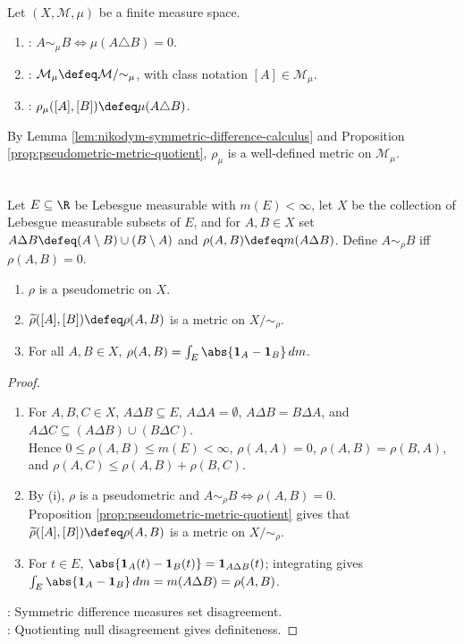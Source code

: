 \begin{definition} \label{def:nikodym-metric-space} \\
Let $(X,\mathcal{M},\mu)$ be a finite measure space.
\begin{enumerate}[label=(\roman*)]
\setlength{\itemsep}{0pt}
\item {}: $A\sim_\mu B\Leftrightarrow\mu(A\triangle B)=0$.
\item {}: $\mathcal{M}_\mu\defeq\mathcal{M}/{\sim_\mu}$, with class notation $[A]\in\mathcal{M}_\mu$.
\item {}: $\rho_\mu([A],[B])\defeq\mu(A\triangle B)$.
\end{enumerate}
By Lemma \ref{lem:nikodym-symmetric-difference-calculus} and Proposition \ref{prop:pseudometric-metric-quotient}, $\rho_\mu$ is a well-defined metric on $\mathcal{M}_\mu$.
\end{definition}

\begin{proposition} \label{prop:nikodym-pseudometric} \\
Let $E\subseteq\R$ be Lebesgue measurable with $m(E)<\infty$, let $X$ be the collection of Lebesgue measurable subsets of $E$, and for $A,B\in X$ set $A\Delta B\defeq(A\setminus B)\cup(B\setminus A)$ and $\rho(A,B)\defeq m(A\Delta B)$. Define $A\sim_\rho B$ iff $\rho(A,B)=0$.
\begin{enumerate}[label=(\roman*)]
\setlength{\itemsep}{0pt}
\item $\rho$ is a pseudometric on $X$.
\item $\widetilde{\rho}([A],[B])\defeq\rho(A,B)$ is a metric on $X/{\sim_\rho}$.
\item For all $A,B\in X$, $\rho(A,B)=\int_E\abs{\mathbf{1}_A-\mathbf{1}_B}\,dm$.
\end{enumerate}
\begin{proof}
\begin{enumerate}[label=(\roman*)]
\setlength{\itemsep}{0pt}
\item For $A,B,C\in X$, $A\Delta B\subseteq E$, $A\Delta A=\emptyset$, $A\Delta B=B\Delta A$, and $A\Delta C\subseteq(A\Delta B)\cup(B\Delta C)$.\\
Hence $0\leq\rho(A,B)\leq m(E)<\infty$, $\rho(A,A)=0$, $\rho(A,B)=\rho(B,A)$, and $\rho(A,C)\leq\rho(A,B)+\rho(B,C)$.
\item By (i), $\rho$ is a pseudometric and $A\sim_\rho B\iff\rho(A,B)=0$.\\
Proposition \ref{prop:pseudometric-metric-quotient} gives that $\widetilde{\rho}([A],[B])\defeq\rho(A,B)$ is a metric on $X/{\sim_\rho}$.
\item For $t\in E$, $\abs{\mathbf{1}_A(t)-\mathbf{1}_B(t)}=\mathbf{1}_{A\Delta B}(t)$; integrating gives $\int_E\abs{\mathbf{1}_A-\mathbf{1}_B}\,dm=m(A\Delta B)=\rho(A,B)$.
\end{enumerate}
: Symmetric difference measures set disagreement.\\
: Quotienting null disagreement gives definiteness.
\end{proof}
\end{proposition}

